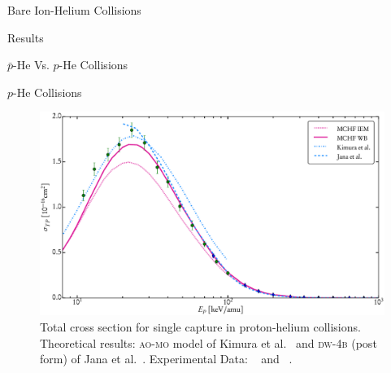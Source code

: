 \documentclass[a5paper, 9 pt]{extreport}
\begin{document}
\begin{chapter}{Bare Ion-Helium Collisions \label{chap:p-he2p-he}}
\begin{section}{Results \label{sec:phe2p-res}}
\begin{subsection}{ \texorpdfstring{$\bar{p}$}{pbar}-He Vs. \texorpdfstring{$p$}{p}-He Collisions
                         \label{sec:pbarhe-res}}
      \end{subsection}

      \begin{subsection}{\texorpdfstring{$p$}{p}-He Collisions \label{sec:phe-res}}

         \begin{figure}[t]
            \centering
            \includegraphics[width = 0.95 \linewidth]{./images/phe/phe-TP.eps}
            \caption[Total cross section for single capture in proton-helium collisions.]
                    {Total cross section for single capture in proton-helium collisions.
                     Theoretical results: \textsc{ao-mo} model of Kimura et al.~\cite{KL-86} and
                     \textsc{dw-4b} (post form) of Jana et al.~\cite{JMP-15}. Experimental Data:
                     {\color{OliveGreen}{$\bullet$}}~\cite{SG89} and
                     {\color{blue}{$\blacklozenge$}}~\cite{SG85}. \label{fig:phe-tp}}
         \end{figure}


\end{subsection}
\end{section}
\end{chapter}
\end{document}
